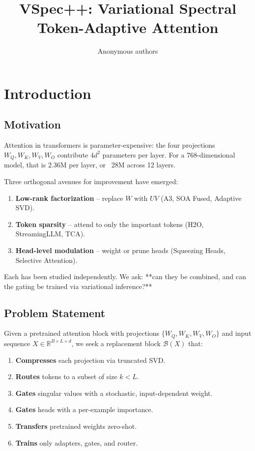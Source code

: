 \title{\textbf{VSpec++: Variational Spectral Token-Adaptive Attention}}

\author{Anonymous authors}


\section{Introduction}

\subsection{Motivation}

Attention in transformers is parameter-expensive: the four projections 
$W_Q, W_K, W_V, W_O$ contribute $4d^2$ parameters per layer. For a 
768-dimensional model, that is 2.36M per layer, or ~28M across 12 layers.

Three orthogonal avenues for improvement have emerged:

\begin{enumerate}
\item \textbf{Low-rank factorization} -- replace $W$ with $UV$ (A3, SOA Fused,
  Adaptive SVD).
\item \textbf{Token sparsity} -- attend to only the important tokens (H2O,
  StreamingLLM, TCA).
\item \textbf{Head-level modulation} -- weight or prune heads (Squeezing Heads,
  Selective Attention).

\end{enumerate}
Each has been studied independently. We ask: **can they be combined, and 
can the gating be trained via variational inference?**

\subsection{Problem Statement}

Given a pretrained attention block with projections $\{W_Q, W_K, W_V, W_O\}$ 
and input sequence $X \in \mathbb{R}^{B \times L \times d}$, we seek a 
replacement block $\mathcal{B}(X)$ that:

\begin{enumerate}
\item \textbf{Compresses} each projection via truncated SVD.
\item \textbf{Routes} tokens to a subset of size $k < L$.
\item \textbf{Gates} singular values with a stochastic, input-dependent weight.
\item \textbf{Gates} heads with a per-example importance.
\item \textbf{Transfers} pretrained weights zero-shot.
\item \textbf{Trains} only adapters, gates, and router.

\end{enumerate}
